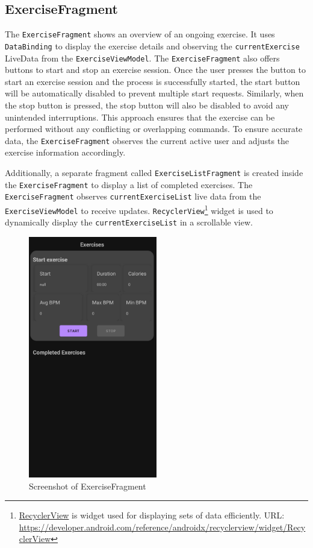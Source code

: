\subsection{ExerciseFragment}
The \texttt{ExerciseFragment} shows an overview of an ongoing exercise. It uses \texttt{DataBinding} to display the exercise details and observing the \texttt{currentExercise} LiveData from the \texttt{ExerciseViewModel}. 
The \texttt{ExerciseFragment} also offers buttons to start and stop an exercise session.
Once the user presses the button to start an exercise session and the process is successfully started, the start button will be automatically disabled to prevent multiple start requests. Similarly, when the stop button is pressed, the stop button will also be disabled to avoid any unintended interruptions. 
This approach ensures that the exercise can be performed without any conflicting or overlapping commands.
To ensure accurate data, the \texttt{ExerciseFragment} observes the current active user and adjusts the exercise information accordingly.

Additionally, a separate fragment called \texttt{ExerciseListFragment} is created inside the \texttt{ExerciseFragment} to display a list of completed exercises. The \texttt{ExerciseFragment} observes \texttt{currentExerciseList} live data from the \texttt{ExerciseViewModel} to receive updates. 
\texttt{RecyclerView}\footnote{\url{RecyclerView} is widget used for displaying sets of data efficiently. URL: \url{https://developer.android.com/reference/androidx/recyclerview/widget/RecyclerView}} widget is used to dynamically display the \texttt{currentExerciseList} in a scrollable view. 

\begin{figure}[H]
    \centering
    \includegraphics[width=0.5\textwidth]{images/exercisefragment-screenshot.png}
    \caption{Screenshot of ExerciseFragment}
    \label{fig:exercisefragment_screenshot}
\end{figure}

